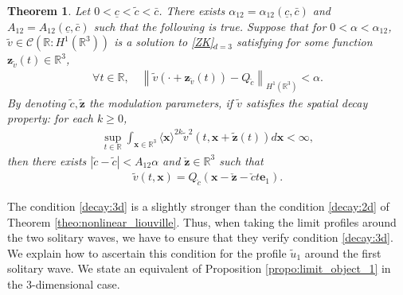 \documentclass[reqno,10pt]{amsart}
\newtheorem{theo}[lemm]{Theorem}
\numberwithin{equation}{section}
\newcommand{\beone}{\mathbf{e}_1}
\newcommand{\bx}{\mathbf{x}}
\newcommand{\bz}{\mathbf{z}}
\begin{document}
\begin{theo}
Let $0<\underline{c}< \tilde{c} < \bar{c}$. There exists $\alpha_{12}=\alpha_{12}(\underline{c}, \bar{c})$ and $A_{12}=A_{12}(\underline{c}, \bar{c})$ such that the following is true. Suppose that for $0< \alpha <\alpha_{12}$, $\tilde{v}\in \mathcal{C}(\mathbb{R}: H^1(\mathbb{R}^3))$ is a solution to \ref{ZK}$_{d=3}$ satisfying for some function $\bz_{\tilde{v}}(t) \in \mathbb{R}^3$,
\begin{align*}
    \forall t \in \mathbb{R}, \quad \left\| \tilde{v}\left( \cdot + \bz_{\tilde{v}}(t) \right) - Q_{\tilde{c}} \right\|_{H^1(\mathbb{R}^3)} < \alpha.
\end{align*}
By denoting $\tilde{c},\tilde{\bz}$ the modulation parameters, if $\tilde{v}$ satisfies the spatial decay property: for each $k \ge 0$, 
\begin{align} \label{decay:3d}
    \sup_{t \in \mathbb{R}} \int_{\bx \in \mathbb{R}^3} \langle \bx \rangle^{2k} \tilde{v}^2(t, \bx + \tilde{\bz}(t)) d\bx <\infty,
\end{align}
then there exists $\left\vert \check{c} -\tilde{c} \right\vert <A_{12} \alpha $ and $\check{\bz} \in \mathbb{R}^3$ such that
\begin{align*}
    \tilde{v}(t,\bx) = Q_{\check{c}} \left( \bx - \check{\bz} - \check{c} t \beone \right).
\end{align*}
\end{theo}

The condition \eqref{decay:3d} is a slightly stronger than the condition \eqref{decay:2d} of Theorem \ref{theo:nonlinear_liouville}. Thus, when taking the limit profiles around the two solitary waves, we have to ensure that they verify condition \eqref{decay:3d}. We explain how to ascertain this condition for the profile $\tilde{u}_1$ around the first solitary wave. We state an equivalent of Proposition \ref{propo:limit_object_1} in the $3$-dimensional case.
\end{document}

